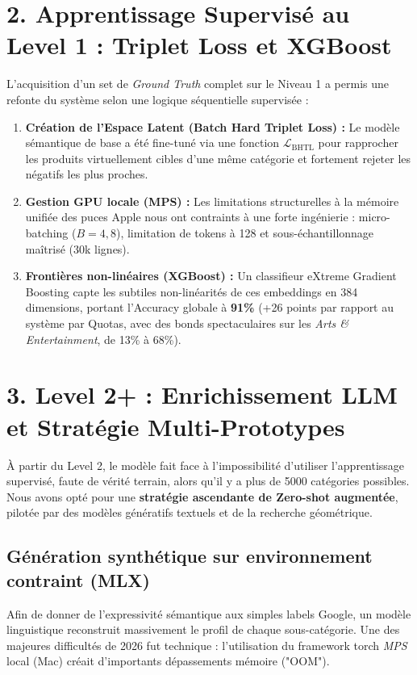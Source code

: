 \documentclass[11pt,a4paper]{article}
\begin{document}
\section{2. Apprentissage Supervisé au Level 1 : Triplet Loss et XGBoost}
L'acquisition d'un set de \textit{Ground Truth} complet sur le Niveau 1 a permis une refonte du système selon une logique séquentielle supervisée :
\begin{enumerate}
    \item \textbf{Création de l'Espace Latent (Batch Hard Triplet Loss) :} Le modèle sémantique de base a été fine-tuné via une fonction  $\mathcal{L}_{\text{BHTL}}$ pour rapprocher les produits virtuellement cibles d'une même catégorie et fortement rejeter les négatifs les plus proches. 
    \item \textbf{Gestion GPU locale (MPS) :} Les limitations structurelles à la mémoire unifiée des puces Apple nous ont contraints à une forte ingénierie : micro-batching ($B=4, 8$), limitation de tokens à 128 et sous-échantillonnage maîtrisé (30k lignes).
    \item \textbf{Frontières non-linéaires (XGBoost) :} Un classifieur eXtreme Gradient Boosting capte les subtiles non-linéarités de ces embeddings en 384 dimensions, portant l'Accuracy globale à \textbf{91\%} (+26 points par rapport au système par Quotas, avec des bonds spectaculaires sur les \textit{Arts \& Entertainment}, de 13\% à 68\%).
\end{enumerate}

\section{3. Level 2+ : Enrichissement LLM et Stratégie Multi-Prototypes}
À partir du Level 2, le modèle fait face à l'impossibilité d'utiliser l'apprentissage supervisé, faute de vérité terrain, alors qu'il y a plus de 5000 catégories possibles.
Nous avons opté pour une \textbf{stratégie ascendante de Zero-shot augmentée}, pilotée par des modèles génératifs textuels et de la recherche géométrique.

\subsection{Génération synthétique sur environnement contraint (MLX)}
Afin de donner de l'expressivité sémantique aux simples labels Google, un modèle linguistique reconstruit massivement le profil de chaque sous-catégorie. Une des majeures difficultés de 2026 fut technique : l'utilisation du framework torch \textit{MPS} local (Mac) créait d'importants dépassements mémoire ("OOM"). 
\end{document}
